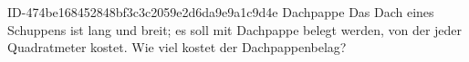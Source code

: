 \begin{exercise}
      {ID-474be168452848bf3c3c2059e2d6da9e9a1c9d4e}
      {Dachpappe}
  \ifproblem\problem
    Das Dach eines Schuppens ist  lang und  breit; es soll
    mit Dachpappe belegt werden, von der jeder Quadratmeter  kostet.
    Wie viel kostet der Dachpappenbelag?
  \fi
\end{exercise}
